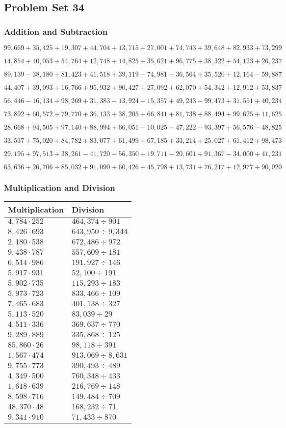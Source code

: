 \hypertarget{problem-set-34-4}{%
\subsection{Problem Set 34}\label{problem-set-34-4}}

\hypertarget{addition-and-subtraction-256}{%
\subsubsection{Addition and
Subtraction}\label{addition-and-subtraction-256}}

\(99,669+35,425+19,307+44,704+13,715+27,001+74,743+39,648+82,933+ 73,299\)

\(14,854+10,053+54,764+12,748+14,825+35,621+96,775+38,322+54,123+26,237\)

\(89,139-38,180+81,423+41,518+39,119-74,981-36,564+35,520+12,164-59,887\)

\(44,407+39,093+16,766+95,932+90,427+27,092+62,070+54,342+12,912+53,837\)

\(56,446-16,134+98,269+31,383-13,924-15,357+49,243-99,473+31,551+40,234\)

\(73,892+60,572+79,770+36,133+38,205+66,841+81,738+88,494+99,625+11,625\)

\(28,668+94,505+97,140+88,994+66,051-10,025-47,222-93,397+56,576-48,825\)

\(33,537+75,020+84,782+83,077+61,499+67,185+33,214+25,027+61,412+98,473\)

\(29,195+97,513+38,261-41,720-56,350+19,711-20,601+91,367-34,000+41,231\)

\(63,636+26,706+85,032+91,090+60,426+45,798+13,731+76,217+12,977+90,920\)

\hypertarget{multiplication-and-division-255}{%
\subsubsection{Multiplication and
Division}\label{multiplication-and-division-255}}

\begin{longtable}[]{@{}ll@{}}
\toprule
Multiplication & Division\tabularnewline
\midrule
\endhead
\(4,784\cdot252\) & \(464,374÷901\)\tabularnewline
\(8,426\cdot693\) & \(643,950÷9,344\)\tabularnewline
\(2,180\cdot538\) & \(672,486÷972\)\tabularnewline
\(9,438\cdot787\) & \(557,609÷181\)\tabularnewline
\(6,514\cdot986\) & \(191,927÷146\)\tabularnewline
\(5,917\cdot931\) & \(52,100÷191\)\tabularnewline
\(5,902\cdot735\) & \(115,293÷183\)\tabularnewline
\(5,973\cdot723\) & \(833,466÷109\)\tabularnewline
\(7,465\cdot683\) & \(401,138÷327\)\tabularnewline
\(5,113\cdot520\) & \(83,039÷29\)\tabularnewline
\(4,511\cdot336\) & \(369,637÷770\)\tabularnewline
\(9,289\cdot889\) & \(335,868÷125\)\tabularnewline
\(85,860\cdot26\) & \(98,118÷391\)\tabularnewline
\(1,567\cdot474\) & \(913,069÷8,631\)\tabularnewline
\(9,755\cdot773\) & \(390,493÷489\)\tabularnewline
\(4,349\cdot500\) & \(760,348÷433\)\tabularnewline
\(1,618\cdot639\) & \(216,769÷148\)\tabularnewline
\(8,598\cdot716\) & \(149,484÷709\)\tabularnewline
\(48,370\cdot48\) & \(168,232÷71\)\tabularnewline
\(9,341\cdot910\) & \(71,433÷870\)\tabularnewline
\bottomrule
\end{longtable}

